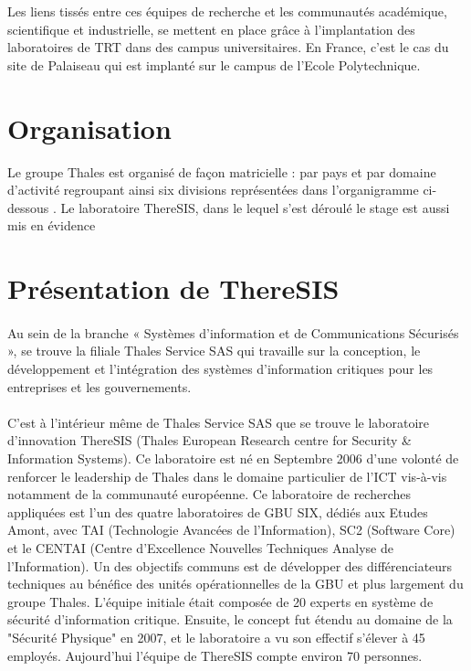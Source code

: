 Les liens tiss\'es entre ces \'equipes de recherche et les communaut\'es acad\'emique, scientifique et industrielle, se mettent en place grâce à l’implantation des laboratoires de TRT dans des campus universitaires. En France, c’est le cas du site de Palaiseau qui est implant\'e sur le campus de l’Ecole Polytechnique.

\section{Organisation}

Le groupe Thales est organis\'e de façon matricielle : par pays et par domaine d’activit\'e regroupant ainsi six divisions repr\'esent\'ees dans l’organigramme ci-dessous . Le laboratoire ThereSIS, dans le lequel s’est d\'eroul\'e le stage est aussi mis en \'evidence



\section{Pr\'esentation de ThereSIS}

\paragraph{} Au sein de la branche « Systèmes d’information et de Communications S\'ecuris\'es », se trouve la filiale Thales Service SAS qui travaille sur la conception, le d\'eveloppement et l’int\'egration des systèmes d’information critiques pour les entreprises et les gouvernements.

\paragraph{} C’est à l’int\'erieur même de Thales Service SAS que se trouve le laboratoire d’innovation ThereSIS (Thales European Research centre for Security \& Information Systems). Ce laboratoire est n\'e en Septembre 2006 d’une volont\'e de renforcer le leadership de Thales dans le domaine particulier de l’ICT vis-à-vis notamment de la communaut\'e europ\'eenne. Ce laboratoire de recherches appliqu\'ees est l’un des quatre laboratoires de GBU SIX, d\'edi\'es aux Etudes Amont, avec TAI (Technologie Avanc\'ees de l’Information), SC2 (Software Core) et le CENTAI (Centre d’Excellence Nouvelles Techniques Analyse de l’Information). Un des objectifs communs est de d\'evelopper des diff\'erenciateurs techniques au b\'en\'efice des unit\'es op\'erationnelles de la GBU et plus largement du groupe Thales.  L’\'equipe initiale \'etait compos\'ee de 20 experts en système de s\'ecurit\'e d’information critique. Ensuite, le concept fut \'etendu au domaine de la "S\'ecurit\'e Physique" en 2007, et le laboratoire a vu son effectif s’\'elever à 45 employ\'es. Aujourd’hui l’\'equipe de ThereSIS compte environ 70 personnes.

